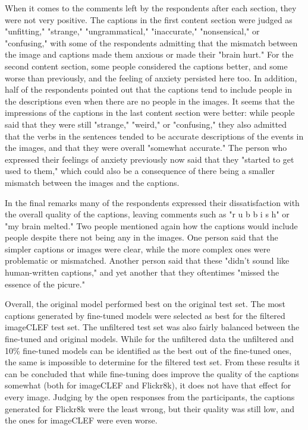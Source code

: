 \documentclass[11pt]{article}
\begin{document}
When it comes to the comments left by the respondents after each section, they were not very positive. The captions in the first content section were judged as "unfitting," "strange," "ungrammatical," "inaccurate," "nonsensical," or "confusing," with some of the respondents admitting that the mismatch between the image and captions made them anxious or made their "brain hurt." For the second content section, some people considered the captions better, and some worse than previously, and the feeling of anxiety persisted here too. In addition, half of the respondents pointed out that the captions tend to include people in the descriptions even when there are no people in the images. It seems that the impressions of the captions in the last content section were better: while people said that they were still "strange," "weird," or "confusing," they also admitted that the verbs in the sentences tended to be accurate descriptions of the events in the images, and that they were overall "somewhat accurate." The person who expressed their feelings of anxiety previously now said that they "started to get used to them," which could also be a consequence of there being a smaller mismatch between the images and the captions.

In the final remarks many of the respondents expressed their dissatisfaction with the overall quality of the captions, leaving comments such as "r u b b i s h" or "my brain melted." Two people mentioned again how the captions would include people despite there not being any in the images. One person said that the simpler captions or images were clear, while the more complex ones were problematic or mismatched. Another person said that these "didn't sound like human-written captions," and yet another that they oftentimes "missed the essence of the picure."

Overall, the original model performed best on the original test set. The most captions generated by fine-tuned models were selected as best for the filtered imageCLEF test set. The unfiltered test set was also fairly balanced between the fine-tuned and original models. While for the unfiltered data the unfiltered and 10\% fine-tuned models can be identified as the best out of the fine-tuned ones, the same is impossible to determine for the filtered test set. From these results it can be concluded that while fine-tuning does improve the quality of the captions somewhat (both for imageCLEF and Flickr8k), it does not have that effect for every image. Judging by the open responses from the participants, the captions generated for Flickr8k were the least wrong, but their quality was still low, and the ones for imageCLEF were even worse.
\end{document}
